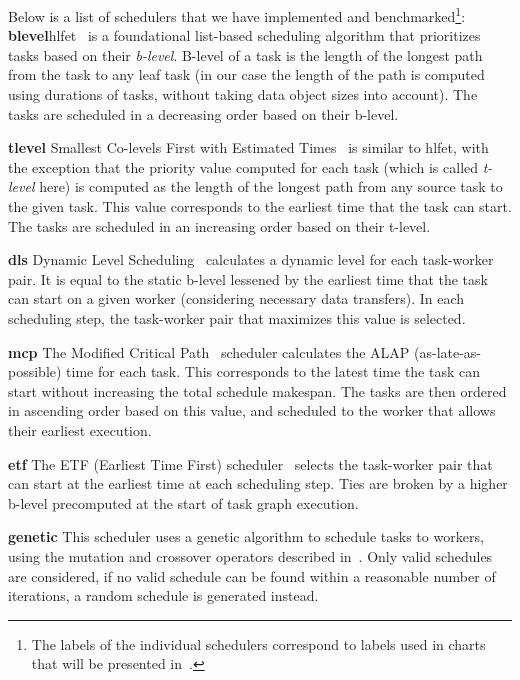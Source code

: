 Below is a list of schedulers that we have implemented and benchmarked\footnote{The labels of the individual schedulers correspond to labels used in charts that will be presented
in~.}:
\noindent\textbf{blevel}\quad \gls{hlfet}~\cite{hlfet1974} is a
foundational list-based scheduling algorithm that prioritizes tasks based on their
\emph{b-level}. B-level of a task is the length of the longest path from the task to any
leaf task (in our case the length of the path is computed using durations of tasks, without taking
data object sizes into account). The tasks are scheduled in a decreasing order based on their
b-level.

\noindent\textbf{tlevel}\quad
Smallest Co-levels First with Estimated Times~\cite{kwok1999static} is similar to
\gls{hlfet}, with the exception that the priority value computed for each task (which
is called \emph{t-level} here) is computed as the length of the longest path from any
source task to the given task. This value corresponds to the earliest time that the task can start.
The tasks are scheduled in an increasing order based on their t-level.

\noindent\textbf{dls}\quad
Dynamic Level Scheduling~\cite{sih1993compile} calculates a dynamic level for each task-worker
pair. It is equal to the static b-level lessened by the earliest time that the task can start on a
given worker (considering necessary data transfers). In each scheduling step, the task-worker pair
that maximizes this value is selected.

\noindent\textbf{mcp}\quad
The Modified Critical Path~\cite{wu1990hypertool} scheduler calculates the ALAP
(as-late-as-possible) time for each task. This corresponds to the latest time the task can start
without increasing the total schedule makespan. The tasks are then ordered in ascending order based
on this value, and scheduled to the worker that allows their earliest execution.

\noindent\textbf{etf}\quad
The ETF (Earliest Time First) scheduler~\cite{hwang1989scheduling} selects the task-worker pair that
can start at the earliest time at each scheduling step. Ties are broken by a higher b-level
precomputed at the start of task graph execution.

\noindent\textbf{genetic}\quad
This scheduler uses a genetic algorithm to schedule tasks to workers, using the mutation and
crossover operators described in~\cite{omara2009genetic}. Only valid schedules are considered, if
no valid schedule can be found within a reasonable number of iterations, a random schedule is
generated instead.

